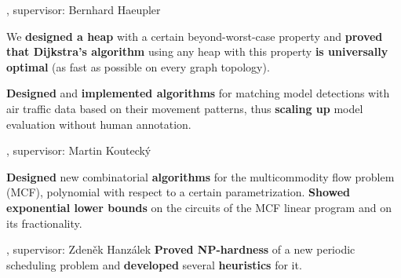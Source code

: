, supervisor: Bernhard Haeupler

\: We {\bf designed a heap} with a certain beyond-worst-case property and {\bf proved that Dijkstra's algorithm} using any heap with this property {\bf is universally optimal} (as fast as possible on every graph topology).
\endlist


%
\: {\bf Designed} and {\bf implemented algorithms} for matching model detections with air traffic data based on their movement patterns, thus {\bf scaling up} model evaluation without human annotation.
%
\endlist

, supervisor: Martin Koutecký

%
\: {\bf Designed} new combinatorial {\bf algorithms} for the multicommodity flow problem (MCF), polynomial with respect to a certain parametrization.
\: {\bf Showed exponential lower bounds} on the circuits of the MCF linear program and on its fractionality.
\endlist

, supervisor: Zdeněk Hanzálek
%
%
\: {\bf Proved NP-hardness} of a new periodic scheduling problem and {\bf
developed} several {\bf heuristics} for it.

\endlist


